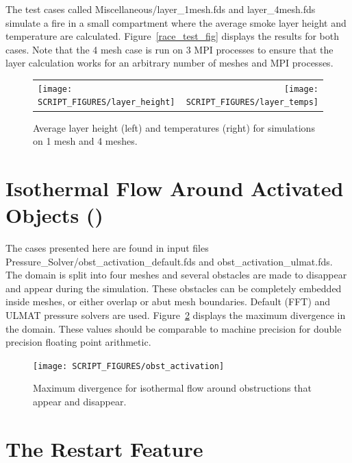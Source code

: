 \documentclass[11pt]{book}
\begin{document}
The test cases called {\ct Miscellaneous/layer\_1mesh.fds} and {\ct layer\_4mesh.fds} simulate a fire in a small compartment where the average smoke layer height and temperature are calculated. Figure~\ref{race_test_fig} displays the results for both cases. Note that the 4 mesh case is run on 3 MPI processes to ensure that the layer calculation works for an arbitrary number of meshes and MPI processes.

\begin{figure}[!ht]
\begin{tabular*}{\textwidth}{lr}
\texttt{[image: SCRIPT\_FIGURES/layer\_height]} &
\texttt{[image: SCRIPT\_FIGURES/layer\_temps]}
\end{tabular*}
\caption[Result of the  test cases]{Average layer height (left) and temperatures (right) for simulations on 1 mesh and 4 meshes.}
\label{layer_fig}
\end{figure}


\section{Isothermal Flow Around Activated Objects (\texorpdfstring{}{obst\_activation})}
\label{obst_activation}

The cases presented here are found in input files {\ct Pressure\_Solver/obst\_activation\_default.fds} and {\ct obst\_activation\_ulmat.fds}. The domain is split into four meshes and several obstacles are made to disappear and appear during the simulation. These obstacles can be completely embedded inside meshes, or either overlap or abut mesh boundaries. Default (FFT) and ULMAT pressure solvers are used. Figure~\ref{obst_act_fig} displays the maximum divergence in the domain. These values should be comparable to machine precision for double precision floating point arithmetic.

\begin{figure}[!ht]
\centering
\texttt{[image: SCRIPT\_FIGURES/obst\_activation]}
\caption[Result of the  test cases]{Maximum divergence for isothermal flow around obstructions that appear and disappear.}
\label{obst_act_fig}
\end{figure}


\newpage

\section{The Restart Feature}
\label{device_restart}
\label{clocks_restart}
\end{document}
